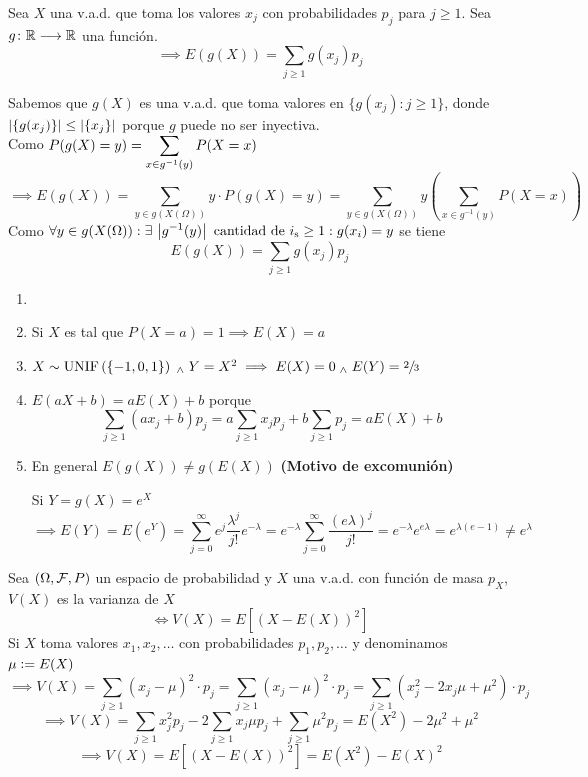 \begin{teo} \label{teo:esperanzaporg}
	Sea $X$ una v.a.d. que toma los valores $x_j$ con probabilidades $p_j$ para $j \geq 1$. Sea $g \colon \mathbb{R} \longrightarrow \mathbb{R}$ una función.
	\[\implies E(g(X))=\sum_{j\geq 1}g(x_j)p_j\]
	\begin{dem}
		Sabemos que $g(X)$ es una v.a.d. que toma valores en $\{g(x_j) : j\geq 1\}$, donde $\left|\{g(x_j)\}\right|\leq\left|\{x_j\}\right|$ porque $g$ puede no ser inyectiva. \\
		Como $\displaystyle P(g(X)=y) = \sum_{x\in g^{-1}(y)} P(X=x)$
		\[\implies E(g(X))=\sum_{y\in g(X(\Omega))}y\cdot P(g(X)=y)=\sum_{y\in g(X(\Omega))}y \left(\sum_{x\in g^{-1}(y)} P(X=x)\right)\]
		Como $\displaystyle \forall y \in g(X(\Omega)) : \exists \, \left|g^{-1}(y)\right| \text{
				cantidad de } i_{\text{s}} \geq 1 : g(x_i)=y$ se tiene
		\[E(g(X))=\sum_{j\geq 1}g(x_j)p_j\]
	\end{dem}
\end{teo}

\begin{obs}
	\begin{enumerate}
		\item[]
		\item Si $X$ es tal que $P(X=a)=1\implies E(X)=a$
		\item $X \sim \operatorname{UNIF}\left(\{-1, 0, 1\}\right) \; _{\wedge} \; Y=X^2 \implies E(X)=0 \; _{\wedge} \; E(Y)=\sfrac{2}{3}$
		\item $E(aX+b)=aE(X)+b$ porque
		      \[\sum_{j\geq 1}(ax_j+b)p_j=a\sum_{j\geq 1}x_jp_j+b\sum_{j\geq 1}p_j=aE(X)+b\]
		\item En general $E(g(X)) \ne g(E(X))$ \hfill \textbf{(Motivo de excomunión)}
		      \begin{ejem}[$X\sim\poisson{\lambda} \implies E(X)=\lambda$]
			      Si $Y=g(X)=e^X$
			      \[\implies E(Y)=E(e^Y)=\sum_{j=0}^\infty e^j\frac{\lambda^j}{j!}e^{-\lambda}=e^{-\lambda}\sum_{j=0}^\infty \frac{(e\lambda)^{j}}{j!}=e^{-\lambda}e^{e\lambda}=e^{\lambda(e-1)}\ne e^\lambda\]
		      \end{ejem}
	\end{enumerate}
\end{obs}

\begin{defn}[Varianza]
	Sea $(\Omega, \mathcal{F}, P)$ un espacio de probabilidad y $X$ una v.a.d. con función de masa $p_X$, $V(X)$ es la varianza de $X$
	\[\iff V(X)=E\left[(X-E(X))^2\right]\]
	Si $X$ toma valores $x_1, x_2, \dots$ con probabilidades $p_1, p_2, \dots$ y
	denominamos $\mu \vcentcolon= E(X)$
	\[\implies V(X)=\sum_{j\geq 1}(x_j-\mu)^2\cdot p_j = \sum_{j\geq 1}(x_j-\mu)^2\cdot p_j = \sum_{j\geq 1}(x_j^2-2x_j\mu+\mu^2)\cdot p_j\]
	\[\implies V(X)=\sum_{j\geq 1}x_j^2p_j -2\sum_{j\geq 1}x_j\mu p_j +\sum_{j\geq 1}\mu^2p_j = E(X^2)-2\mu^2+\mu^2\]
	\[\implies \boxed{V(X) = E\left[\left(X-E(X)\right)^2\right] = E\left(X^2\right)-{E(X)}^2}\]
\end{defn}

